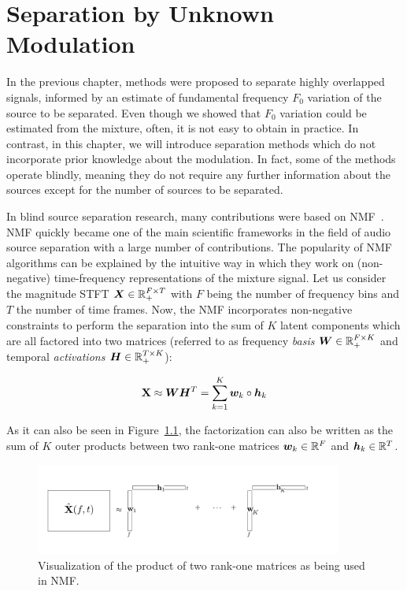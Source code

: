 \chapter{Separation by Unknown Modulation}
\label{cha:unknown}

In the previous chapter, methods were proposed to separate highly overlapped signals, informed by an estimate of fundamental frequency \(F_0\) variation of the source to be separated.
Even though we showed that \(F_0\)  variation could be estimated from the mixture, often, it is not easy to obtain in practice.
In contrast, in this chapter, we will introduce separation methods which do not incorporate prior knowledge about the modulation. 
In fact, some of the methods operate blindly, meaning they do not require any further information about the sources except for the number of sources to be separated.
\par
In blind source separation research, many contributions were based on \ac{NMF}~\cite{lee99, lee01}.
\acs{NMF} quickly became one of the main scientific frameworks in the field of audio source separation with a large number of contributions.
The popularity of \acs{NMF} algorithms can be explained by the intuitive way in which they work on (non-negative) time-frequency representations of the mixture signal.
Let us consider the magnitude \acs{STFT} \({\bm{X}} \in {\mathbb{R}}_{+}^{F \times T}\) with \(F\) being the number of frequency bins and \(T\) the number of time frames.
Now, the \acs{NMF} incorporates non-negative constraints to perform the separation into the sum of \(K\) latent components which are all factored into two matrices (referred to as frequency \emph{basis} \({\bm{W}} \in {\mathbb{R}}_{+}^ { F \times K }\) and temporal \emph{activations} \({\bm{H}} \in {\mathbb{R}}_{+}^ { T \times K }\)):

\begin{equation}
   \mathbf{X} \approx {\bm{W}} {\bm{H}}^{T} = \sum\limits_{k=1}^{K} {\bm{w}}_{k} \circ {\bm{h}}_{k}
   \label{eq:vanilla_nmf}
\end{equation}

As it can also be seen in Figure~\ref{fig:nmf}, the factorization can also be written as the sum of \(K\) outer products between two rank-one matrices \({\bm{w}}_k \in {\mathbb{R}}^F\) and \({\bm{h}}_k \in {\mathbb{R}}^T\).

\begin{figure}[ht]
  \centering
  \includegraphics[width=0.9\textwidth]{Chapters/06_Separation_Unknown/figures/nmf.pdf}
  \caption{Visualization of the product of two rank-one matrices as being used in \ac{NMF}.}
  \label{fig:nmf}
\end{figure}

